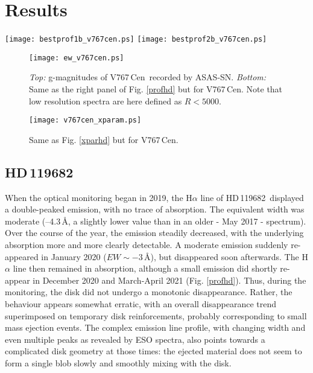 \documentclass[a4paper,fleqn,usenatbib]{mnras}
\newcommand{\hd}{HD\,119682}
\newcommand{\vc}{V767\,Cen}
\begin{document}
\section{Results}

\begin{figure*}
  \begin{center}
    \texttt{[image: bestprof1b\_v767cen.ps]}
    \texttt{[image: bestprof2b\_v767cen.ps]}
  \end{center}
  \caption{Same as left panel of Fig. \ref{profhd} but for the profiles of \vc. Note that low resolution spectra here have $R<5000$. }
\label{profvc}
\end{figure*}

\begin{figure}
  \begin{center}
    \texttt{[image: ew\_v767cen.ps]}
  \end{center}
  \caption{{\it Top:} g-magnitudes of \vc\ recorded by ASAS-SN. {\it Bottom:} Same as the right panel of Fig. \ref{profhd} but for \vc. Note that low resolution spectra are here defined as $R<5000$. }
\label{profvc2}
\end{figure}

\begin{figure}
  \begin{center}
    \texttt{[image: v767cen\_xparam.ps]}
  \end{center}
  \caption{Same as Fig. \ref{xparhd} but for \vc. }
\label{xparvc}
\end{figure}

\subsection{\hd}
When the optical monitoring began in 2019, the H$\alpha$ line of \hd\ displayed a double-peaked emission, with no trace of absorption. The equivalent width was moderate (--4.3\,\AA, a slightly lower value than in an older - May 2017 - spectrum). Over the course of the year, the emission steadily decreased, with the underlying absorption more and more clearly detectable. A moderate emission suddenly re-appeared in January 2020 ($EW\sim-3$\,\AA), but disappeared soon afterwards. The H$\alpha$ line then remained in absorption, although a small emission did shortly re-appear in December 2020 and March-April 2021 (Fig. \ref{profhd}). Thus, during the monitoring, the disk did not undergo a monotonic disappearance. Rather, the behaviour appears somewhat erratic, with an overall disappearance trend superimposed on temporary disk reinforcements, probably corresponding to small mass ejection events. The complex emission line profile, with changing width and even multiple peaks as revealed by ESO spectra, also points towards a complicated disk geometry at those times: the ejected material does not seem to form a single blob slowly and smoothly mixing with the disk.
\end{document}
